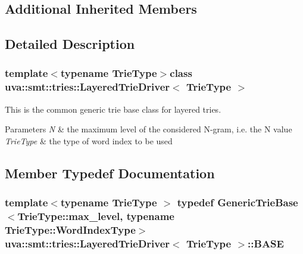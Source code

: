 \subsection*{Additional Inherited Members}


\subsection{Detailed Description}
\subsubsection*{template$<$typename Trie\+Type$>$class uva\+::smt\+::tries\+::\+Layered\+Trie\+Driver$<$ Trie\+Type $>$}

This is the common generic trie base class for layered tries. 
\begin{DoxyParams}{Parameters}
{\em N} & the maximum level of the considered N-\/gram, i.\+e. the N value \\
\hline
{\em Trie\+Type} & the type of word index to be used \\
\hline
\end{DoxyParams}


\subsection{Member Typedef Documentation}
\hypertarget{classuva_1_1smt_1_1tries_1_1_layered_trie_driver_a039f866f4bab8e7313cfc9fa2cb51f5b}{}
\subsubsection[{B\+A\+S\+E}]{\setlength{\rightskip}{0pt plus 5cm}template$<$typename Trie\+Type $>$ typedef {\bf Generic\+Trie\+Base}$<$Trie\+Type\+::max\+\_\+level, typename Trie\+Type\+::\+Word\+Index\+Type$>$ {\bf uva\+::smt\+::tries\+::\+Layered\+Trie\+Driver}$<$ Trie\+Type $>$\+::{\bf B\+A\+S\+E}}\label{classuva_1_1smt_1_1tries_1_1_layered_trie_driver_a039f866f4bab8e7313cfc9fa2cb51f5b}
\hypertarget{classuva_1_1smt_1_1tries_1_1_layered_trie_driver_a260d262d60ecb64e33f39609e4dcfae9}{}
